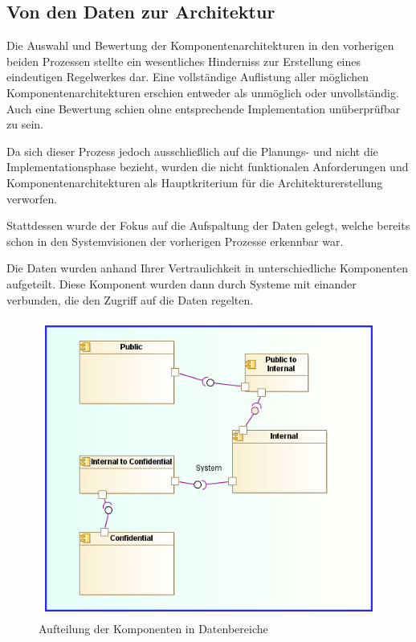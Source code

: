 \subsection{Von den Daten zur Architektur}
Die Auswahl und Bewertung der Komponentenarchitekturen in den vorherigen beiden Prozessen stellte ein wesentliches Hinderniss zur Erstellung eines eindeutigen Regelwerkes dar. Eine vollständige Auflistung aller möglichen Komponentenarchitekturen erschien entweder als unmöglich oder unvollständig. Auch eine Bewertung schien ohne entsprechende Implementation unüberprüfbar zu sein.

Da sich dieser Prozess jedoch ausschließlich auf die Planungs- und nicht die Implementationsphase bezieht, wurden die nicht funktionalen Anforderungen und Komponentenarchitekturen als Hauptkriterium für die Architekturerstellung verworfen.

Stattdessen wurde der Fokus auf die Aufspaltung der Daten gelegt, welche bereits schon in den Systemvisionen der vorherigen Prozesse erkennbar war.

Die Daten wurden anhand Ihrer Vertraulichkeit in unterschiedliche Komponenten aufgeteilt. Diese Komponent wurden dann durch Systeme mit einander verbunden, die den Zugriff auf die Daten regelten.

\begin{figure}[!htbp]
    \centering
    \includegraphics[scale=0.7]{uml/vision3.png}
    \caption{Aufteilung der Komponenten in Datenbereiche}
\end{figure}

